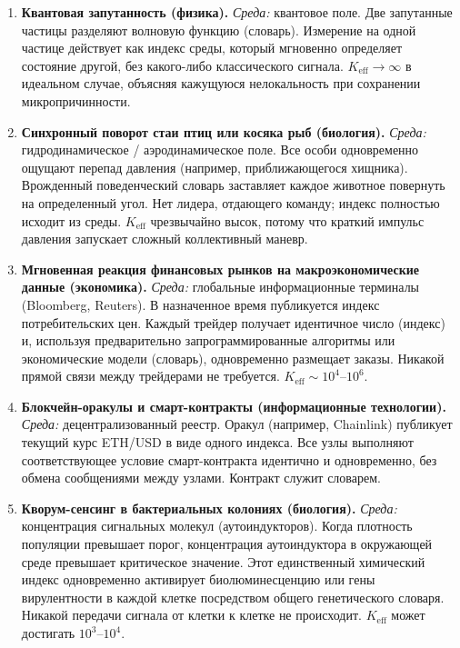 \documentclass[11pt,a4paper]{article}
\begin{document}
	\begin{enumerate}[leftmargin=*]
		\item \textbf{Квантовая запутанность (физика).}
		\textit{Среда:} квантовое поле. Две запутанные частицы разделяют волновую функцию (словарь).
		Измерение на одной частице действует как индекс среды, который мгновенно определяет
		состояние другой, без какого-либо классического сигнала. $K_{\mathrm{eff}}\to\infty$ в идеальном случае,
		объясняя кажущуюся нелокальность при сохранении микропричинности.
		
		\item \textbf{Синхронный поворот стаи птиц или косяка рыб (биология).}
		\textit{Среда:} гидродинамическое / аэродинамическое поле. Все особи одновременно ощущают
		перепад давления (например, приближающегося хищника). Врожденный поведенческий словарь заставляет каждое
		животное повернуть на определенный угол. Нет лидера, отдающего команду; индекс полностью исходит из среды.
		$K_{\mathrm{eff}}$ чрезвычайно высок, потому что краткий импульс давления запускает сложный
		коллективный маневр.
		
		\item \textbf{Мгновенная реакция финансовых рынков на макроэкономические данные (экономика).}
		\textit{Среда:} глобальные информационные терминалы (Bloomberg, Reuters). В назначенное время публикуется
		индекс потребительских цен. Каждый трейдер получает идентичное число (индекс) и, используя
		предварительно запрограммированные алгоритмы или экономические модели (словарь), одновременно размещает заказы. Никакой прямой связи между трейдерами не требуется. $K_{\mathrm{eff}}\sim 10^{4}$--$10^{6}$.
		
		\item \textbf{Блокчейн-оракулы и смарт-контракты (информационные технологии).}
		\textit{Среда:} децентрализованный реестр. Оракул (например, Chainlink) публикует текущий
		курс ETH/USD в виде одного индекса. Все узлы выполняют соответствующее условие смарт-контракта
		идентично и одновременно, без обмена сообщениями между узлами. Контракт служит словарем.
		
		\item \textbf{Кворум-сенсинг в бактериальных колониях (биология).}
		\textit{Среда:} концентрация сигнальных молекул (аутоиндукторов). Когда плотность популяции
		превышает порог, концентрация аутоиндуктора в окружающей среде превышает критическое
		значение. Этот единственный химический индекс одновременно активирует биолюминесценцию или гены вирулентности в
		каждой клетке посредством общего генетического словаря. Никакой передачи сигнала от клетки к клетке
		не происходит. $K_{\mathrm{eff}}$ может достигать $10^{3}$--$10^{4}$.
	\end{enumerate}
	
\end{document}
